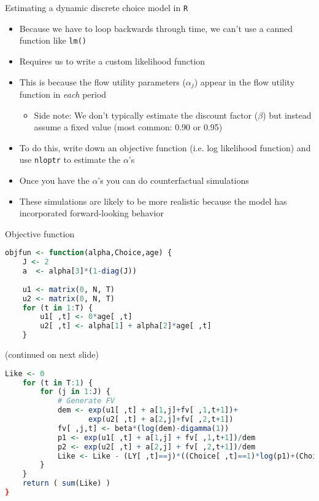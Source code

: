 \documentclass[english,aspectratio=169,12pt,xcolor=dvipsnames]{beamer}
\begin{document}
\begin{frame}{Estimating a dynamic discrete choice model in \texttt{R}}
\begin{itemize}
    \item Because we have to loop backwards through time, we can't use a canned function like \texttt{lm()}
    \item Requires us to write a custom likelihood function
    \item This is because the flow utility parameters ($\alpha_j$) appear in the flow utility function in \emph{each} period
        \begin{itemize}
            \item Side note: We don't typically estimate the discount factor ($\beta$) but instead assume a fixed value (most common: 0.90 or 0.95)
        \end{itemize}
    \item To do this, write down an objective function (i.e. log likelihood function) and use \texttt{nloptr} to estimate the $\alpha$'s
    \item Once you have the $\alpha$'s you can do counterfactual simulations
    \item These simulations are likely to be more realistic because the model has incorporated forward-looking behavior
\end{itemize}
\end{frame}


\begin{frame}[fragile]{Objective function}
\begin{lstlisting}[language=R]
objfun <- function(alpha,Choice,age) {
    J <- 2
    a  <- alpha[3]*(1-diag(J))
    
    u1 <- matrix(0, N, T)
    u2 <- matrix(0, N, T)
    for (t in 1:T) {
        u1[ ,t] <- 0*age[ ,t]
        u2[ ,t] <- alpha[1] + alpha[2]*age[ ,t]
    }

\end{lstlisting}
(continued on next slide)
\end{frame}


\begin{frame}
\begin{lstlisting}[language=R]
    Like <- 0
    for (t in T:1) {
        for (j in 1:J) {
            # Generate FV
            dem <- exp(u1[ ,t] + a[1,j]+fv[ ,1,t+1])+
                   exp(u2[ ,t] + a[2,j]+fv[ ,2,t+1])
            fv[ ,j,t] <- beta*(log(dem)-digamma(1))
            p1 <- exp(u1[ ,t] + a[1,j] + fv[ ,1,t+1])/dem
            p2 <- exp(u2[ ,t] + a[2,j] + fv[ ,2,t+1])/dem
            Like <- Like - (LY[ ,t]==j)*((Choice[ ,t]==1)*log(p1)+(Choice[ ,2]==2)*log(p2))
        }
    }
    return ( sum(Like) )
}
\end{lstlisting}
\end{frame}    
\end{document}
